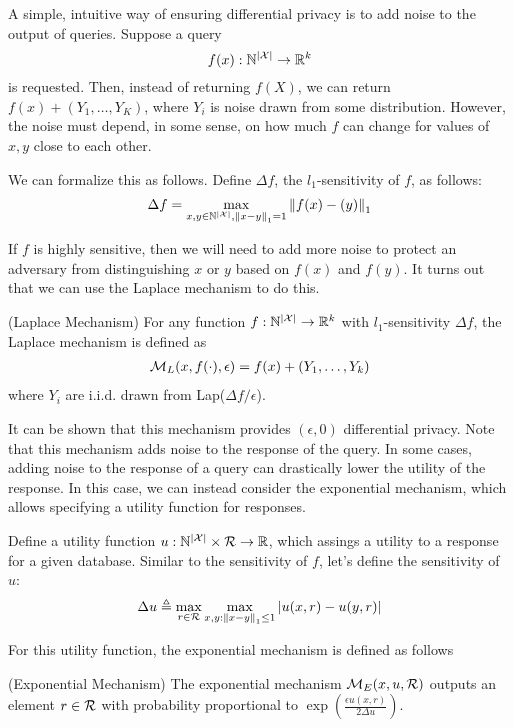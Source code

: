 \documentclass{article} %
\begin{document}
A simple, intuitive way of ensuring differential privacy is to add noise to the
output of queries. Suppose a query
\[ f(x) : \mathbb{N}^{\left\lvert\mathcal{X}\right\rvert} \rightarrow \mathbb{R}^k \]
is requested. Then, instead of
returning $f(X)$, we can return $f(x) + (Y_1, \dots, Y_K)$, where $Y_i$ is noise
drawn from some distribution. However, the noise must depend, in some sense, on
how much $f$ can change for values of $x, y$ close to each other.

We can formalize this as follows. Define $\Delta f$, the $l_1$-sensitivity of
$f$, as follows:
\begin{align*}
\Delta f = \max_{x, y \in \mathbb{N}^{\left\lvert\mathcal{X}\right\rvert}, \left\lVert x - y\right\rVert_1 = 1} \left\lVert f(x) - (y)\right\rVert_1
\end{align*}

If $f$ is highly sensitive, then we will need to add more noise to protect an
adversary from distinguishing $x$ or $y$ based on $f(x)$ and $f(y)$. It turns
out that we can use the Laplace mechanism to do this.

\begin{definition}{(Laplace Mechanism)}
For any function $f : \mathbb{N}^{\left\lvert\mathcal{X}\right\rvert} \rightarrow \mathbb{R}^k$ with $l_1$-sensitivity
$\Delta f$, the Laplace mechanism is defined as
\begin{align*}
\mathcal{M}_L(x, f(\cdot), \epsilon) = f(x) + (Y_1, \dots, Y_k)
\end{align*}
where $Y_i$ are i.i.d. drawn from Lap($\Delta f / \epsilon$).
\end{definition}

It can be shown that this mechanism provides $(\epsilon, 0)$ differential
privacy. Note that this mechanism adds noise to the response of the query.
In some cases, adding noise to the response of a query can drastically lower
the utility of the response. In this case, we can instead consider the
exponential mechanism, which allows specifying a utility function for responses.

Define a utility function $u : \mathbb{N}^{\left\lvert\mathcal{X}\right\rvert} \times \mathcal{R} \rightarrow \mathbb{R}$,
which assings a utility to a response for a given database. Similar to the
sensitivity of $f$, let's define the sensitivity of $u$:
\begin{align*}
\Delta u \triangleq \max_{r \in \mathcal{R}} \max_{x, y : \left\lVert x - y\right\rVert_1 \leq 1} \left\lvert u(x, r) - u(y, r)\right\rvert
\end{align*}

For this utility function, the exponential mechanism is defined as follows
\begin{definition}{(Exponential Mechanism)}
The exponential mechanism $\mathcal{M}_E(x, u, \mathcal{R})$ outputs an element $r \in \mathcal{R}$ with
probability proportional to $\exp{(\frac{\epsilon u(x, r)}{2 \Delta u})}$.
\end{definition}
\end{document}
